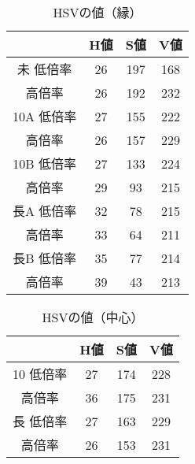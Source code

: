 \documentclass[main]{subfiles}
\begin{document}
\begin{table}[h]
    \caption{HSVの値（縁）}
    \label{table:HSV1}
    \centering
\begin{tabular}{c|c|c|c}
    & H値 & S値 & V値 \\ \hline
   未 低倍率 & 26 & 197 & 168 \\ \hline
   高倍率 & 26 & 192 & 232 \\ \hline\hline
   10A 低倍率 & 27 & 155 & 222 \\ \hline
   高倍率 & 26 & 157 & 229 \\ \hline
   10B 低倍率 & 27 & 133 & 224 \\ \hline
   高倍率 & 29 & 93 & 215 \\ \hline\hline
   長A 低倍率 & 32 & 78 & 215 \\ \hline
   高倍率 & 33 & 64 & 211 \\ \hline
   長B 低倍率 & 35 & 77 & 214 \\ \hline
   高倍率 & 39 & 43 & 213 \\
\end{tabular}    
\end{table}

\begin{table}[h]
    \caption{HSVの値（中心）}
    \label{table:RGB2}
    \centering
\begin{tabular}{c|c|c|c}
    & H値 & S値 & V値 \\ \hline
   10 低倍率 & 27 & 174 & 228 \\ \hline
   高倍率 & 36 & 175 & 231 \\ \hline\hline
   長 低倍率 & 27 & 163 & 229 \\ \hline
   高倍率 & 26 & 153 & 231 \\ 
\end{tabular}    
\end{table}
\end{document}
